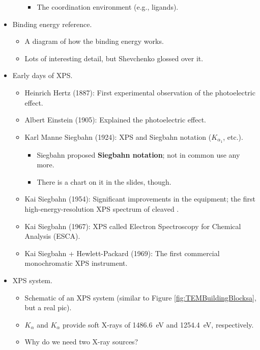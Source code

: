 \documentclass[../notes.tex]{subfiles}
\begin{document}
\begin{itemize}
\begin{itemize}
\begin{itemize}
            \item The coordination environment (e.g., ligands).
        \end{itemize}
    \end{itemize}
    \item Binding energy reference.
    \begin{itemize}
        \item A diagram of how the binding energy works.
        \item Lots of interesting detail, but Shevchenko glossed over it.
    \end{itemize}
    \item Early days of XPS.
    \begin{itemize}
        \item Heinrich Hertz (1887): First experimental observation of the photoelectric effect.
        \item Albert Einstein (1905): Explained the photoelectric effect.
        \item Karl Manne Siegbahn (1924): XPS and Siegbahn notation ($K_{\alpha_1}$, etc.).
        \begin{itemize}
            \item Siegbahn proposed \textbf{Siegbahn notation}; not in common use any more.
            \item There is a chart on it in the slides, though.
        \end{itemize}
        \item Kai Siegbahn (1954): Significant improvements in the equipment; the first high-energy-resolution XPS spectrum of cleaved .
        \item Kai Siegbahn (1967): XPS called Electron Spectroscopy for Chemical Analysis (ESCA).
        \item Kai Siegbahn + Hewlett-Packard (1969): The first commercial monochromatic XPS instrument.
    \end{itemize}
    \item XPS system.
    \begin{itemize}
        \item Schematic of an XPS system (similar to Figure \ref{fig:TEMBuildingBlocksa}, but a real pic).
        \item {} $K_\alpha$ and  $K_\alpha$ provide soft X-rays of \SI{1486.6}{\electronvolt} and \SI{1254.4}{\electronvolt}, respectively.
        \item Why do we need two X-ray sources?
        \begin{itemize}

\end{itemize}
\end{itemize}
\end{itemize}
\end{document}
